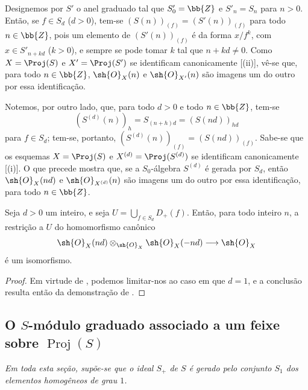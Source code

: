 \documentclass[oneside,10pt]{amsart}
\makeatletter
\newcommand{\ega@arrow}[2]{\mathchoice{#1}{#2}{#2}{#2}}
\renewcommand{\to}{\ega@arrow{\longrightarrow}{\rightarrow}}
\let\EGAOriginalLabel\label
\renewcommand{\label}[1]{\phantomsection\EGAOriginalLabel{#1}}
\makeatother
\begin{document}
\begin{env}[2.5.16]
\label{II.2.5.16}
Designemos por $S'$ o anel graduado tal que $S'_0=\bb{Z}$ e $S'_n=S_n$ para $n>0$.
Então, se $f\in S_d$ ($d>0$), tem-se $(S(n))_{(f)}=(S'(n))_{(f)}$ para todo $n\in\bb{Z}$, pois um elemento de $(S'(n))_{(f)}$ é da forma $x/f^k$, com $x\in S'_{n+kd}$ ($k>0$), e sempre se pode tomar $k$ tal que $n+kd\neq0$.
Como $X=\Proj(S)$ e $X'=\Proj(S')$ se identificam canonicamente [(ii)], vê-se que, para todo $n\in\bb{Z}$, $\sh{O}_X(n)$ e $\sh{O}_{X'}(n)$ são imagens um do outro por essa identificação.

Notemos, por outro lado, que, para todo $d>0$ e todo $n\in\bb{Z}$, tem-se
\[
  (S^{(d)}(n))_h=S_{(n+h)d}=(S(nd))_{hd}
\]
para $f\in S_d$; tem-se, portanto, $(S^{(d)}(n))_{(f)}=(S(nd))_{(f)}$.
Sabe-se que os esquemas $X=\Proj(S)$ e $X^{(d)}=\Proj(S^{(d)})$ se identificam canonicamente [(i)].
O que precede mostra que, se a $S_0$-álgebra $S^{(d)}$ é gerada por $S_d$, então $\sh{O}_X(nd)$ e $\sh{O}_{X^{(d)}}(n)$ são imagens um do outro por essa identificação, para todo $n\in\bb{Z}$.
\end{env}

\begin{proposition}[2.5.17]
\label{II.2.5.17}
Seja $d>0$ um inteiro, e seja $U=\bigcup_{f\in S_d}D_+(f)$.
Então, para todo inteiro $n$, a restrição a $U$ do homomorfismo canônico
\[
  \sh{O}_X(nd)\otimes_{\sh{O}_X}\sh{O}_X(-nd)\to\sh{O}_X
\]
é um isomorfismo.
\end{proposition}

\begin{proof}
Em virtude de , podemos limitar-nos ao caso em que $d=1$, e a conclusão resulta então da demonstração de .
\end{proof}

\subsection{O $S$-módulo graduado associado a um feixe sobre $\operatorname{Proj}(S)$}
\label{subsection:II.2.6}

\emph{Em toda esta seção, supõe-se que o ideal $S_+$ de $S$ é gerado pelo conjunto $S_1$ dos elementos homogêneos de grau $1$.}
\end{document}
